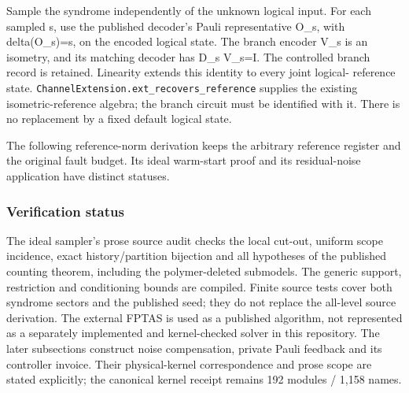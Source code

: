 \documentclass[
]{article}
\begin{document}
Sample the syndrome independently of the unknown logical input. For each
sampled s, use the published decoder's Pauli representative O\_s, with
delta(O\_s)=s, on the encoded logical state. The branch encoder V\_s is
an isometry, and its matching decoder has D\_s V\_s=I. The controlled
branch record is retained. Linearity extends this identity to every
joint logical- reference state.
\texttt{C\allowbreak{}h\allowbreak{}a\allowbreak{}n\allowbreak{}n\allowbreak{}e\allowbreak{}l\allowbreak{}E\allowbreak{}x\allowbreak{}t\allowbreak{}e\allowbreak{}n\allowbreak{}s\allowbreak{}i\allowbreak{}o\allowbreak{}n\allowbreak{}.\allowbreak{}e\allowbreak{}x\allowbreak{}t\allowbreak{}\_\allowbreak{}r\allowbreak{}e\allowbreak{}c\allowbreak{}o\allowbreak{}v\allowbreak{}e\allowbreak{}r\allowbreak{}s\allowbreak{}\_\allowbreak{}r\allowbreak{}e\allowbreak{}f\allowbreak{}e\allowbreak{}r\allowbreak{}e\allowbreak{}n\allowbreak{}c\allowbreak{}e}
supplies the existing isometric-reference algebra; the branch circuit
must be identified with it. There is no replacement by a fixed default
logical state.

The following reference-norm derivation keeps the arbitrary reference
register and the original fault budget. Its ideal warm-start proof and
its residual-noise application have distinct statuses.

\subsubsection{Verification status}\label{verification-status}

The ideal sampler's prose source audit checks the local cut-out, uniform
scope incidence, exact
h\allowbreak{}i\allowbreak{}s\allowbreak{}t\allowbreak{}o\allowbreak{}r\allowbreak{}y\allowbreak{}/\allowbreak{}p\allowbreak{}a\allowbreak{}r\allowbreak{}t\allowbreak{}i\allowbreak{}t\allowbreak{}i\allowbreak{}o\allowbreak{}n
bijection and all hypotheses of the published counting theorem,
including the polymer-deleted submodels. The generic support,
restriction and conditioning bounds are compiled. Finite source tests
cover both syndrome sectors and the published seed; they do not replace
the all-level source derivation. The external FPTAS is used as a
published algorithm, not represented as a separately implemented and
kernel-checked solver in this repository. The later subsections
construct noise compensation, private Pauli feedback and its controller
invoice. Their physical-kernel correspondence and prose scope are stated
explicitly; the canonical kernel receipt remains 192 modules / 1,158
names.
\end{document}
